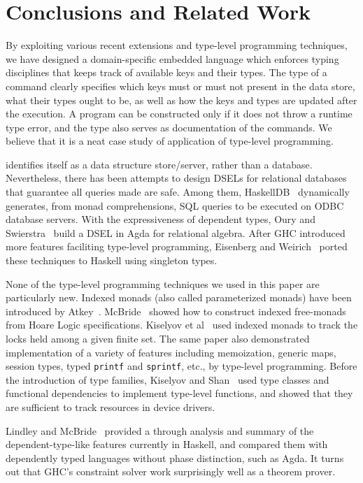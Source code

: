 
\section{Conclusions and Related Work}
\label{sec:conclusions}

By exploiting various recent extensions and type-level programming techniques,
we have designed a domain-specific embedded language \Edis{} which enforces
typing disciplines that keeps track of available keys and their types. The
type of a command clearly specifies which keys must or must not present in
the data store, what their types ought to be, as well as how the keys and types are updated after the execution. A program can be constructed only if it does
not throw a runtime type error, and the type also serves as documentation of the
commands. We believe that it is a neat case study of application of type-level programming.

\Redis{} identifies itself as a data structure store/server, rather than a
database. Nevertheless, there has been attempts to design DSELs for relational
databases that guarantee all queries made are safe. Among them, {\sc HaskellDB}~\cite{haskelldb,haskelldbimproved} dynamically generates, from monad comprehensions, SQL queries to be executed on ODBC database servers.
With the expressiveness of dependent types, Oury and Swierstra~\cite{pi}
build a DSEL in Agda for relational algebra. After GHC introduced more features
faciliting type-level programming, Eisenberg and Weirich~\cite{singletons}
ported these techniques to Haskell using singleton types.

None of the type-level programming techniques we used in this paper are
particularly new. Indexed monads (also called parameterized monads) have been
introduced by Atkey~\cite{indexedmonad}. McBride~\cite{kleisli} showed how to
construct indexed free-monads from Hoare Logic specifications.
Kiselyov et al~\cite{typefun} used indexed monads to track the locks held among
a given finite set. The same paper also demonstrated implementation of a
variety of features including memoization, generic maps, session types, typed \texttt{printf} and \texttt{sprintf}, etc., by type-level programming.
Before the introduction of type families, Kiselyov and Shan~\cite{staticresources} used type classes and functional dependencies to
implement type-level functions, and showed that they are sufficient to track
resources in device drivers.


Lindley and McBride~\cite{phasedistinction} provided a through analysis and summary of the dependent-type-like features currently in Haskell, and
compared them with dependently typed languages without phase distinction, such as Agda. It turns out that GHC's constraint solver work surprisingly well as a theorem
prover.
